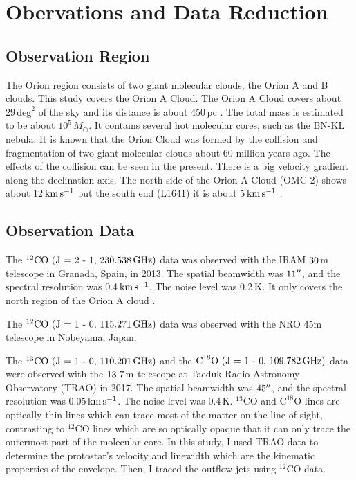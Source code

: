 \section{Obervations and Data Reduction}

\subsection{Observation Region}
The Orion region consists of two giant molecular clouds, the Orion A and B clouds. This study covers the Orion A Cloud. The Orion A Cloud covers about $29 \, \textrm{deg}^2$ of the sky and its distance is about 450$\,$pc \cite{kounkel2017gould}. The total mass is estimated to be about $10^5 \, M_{\odot}$. It contains several hot molecular cores, such as the BN-KL nebula. It is known that the Orion Cloud was formed by the collision and fragmentation of two giant molecular clouds about 60 million years ago. The effects of the collision can be seen in the present. There is a big velocity gradient along the declination axis. The north side of the Orion A Cloud (OMC 2) shows about 12$\, \rm km\,s^{-1}$ but the south end (L1641) it is about 5$\, \rm km\,s^{-1}$ \cite{schulz2012formation}.

\subsection{Observation Data}
The $^{12}\textrm{CO (J = 2 - 1, 230.538\,GHz)}$ data was observed with the IRAM $\textrm{30\,m}$ telescope in Granada, Spain, in 2013. The spatial beamwidth was $\textrm 11^{\prime\prime}$, and the spectral resolution was 0.4$\, \rm km\,s^{-1}$. The noise level was 0.2$\, \rm K$. It only covers the north region of the Orion A cloud \cite{berne2014iram}.

The $^{12}\textrm{CO (J = 1 - 0, 115.271\,GHz})$ data was observed with the NRO 45m telescope in Nobeyama, Japan.

The $^{13}\textrm{CO (J = 1 - 0, 110.201\,GHz})$ and the $\textrm{C}^{18}\textrm{O (J = 1 - 0, 109.782\,GHz})$ data were observed with the $\textrm{13.7\,m}$ telescope at Taeduk Radio Astronomy Observatory (TRAO) in 2017. The spatial beamwidth was $\textrm 45^{\prime\prime}$, and the spectral resolution was 0.05$\, \rm km\,s^{-1}$. The noise level was 0.4$\,$K.
$^{13}\textrm{CO}$ and $\textrm{C}^{18}\textrm{O}$ lines are optically thin lines which can trace most of the matter on the line of sight, contrasting to $^{12}\textrm{CO}$ lines which are so optically opaque that it can only trace the outermost part of the molecular core. In this study, I used TRAO data to determine the protostar's velocity and linewidth which are the kinematic properties of the envelope. Then, I traced the outflow jets using $^{12}$CO data.

